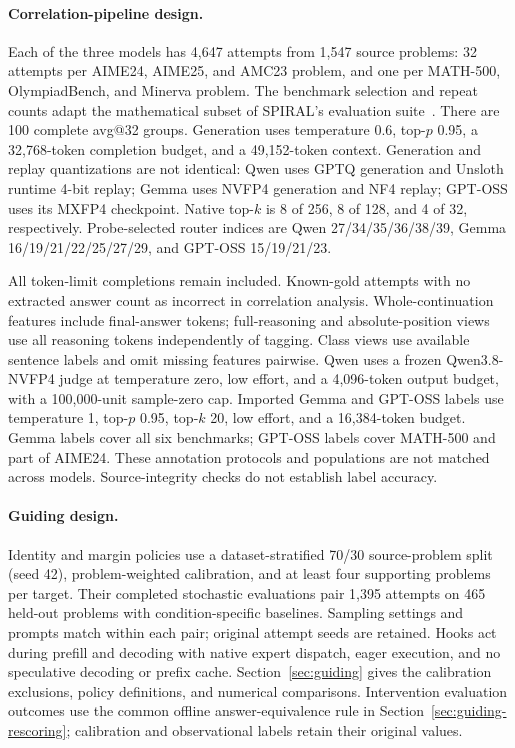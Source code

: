 \paragraph{Correlation-pipeline design.}
Each of the three models has 4,647 attempts from 1,547 source problems:
32 attempts per AIME24, AIME25, and AMC23 problem, and one per MATH-500,
OlympiadBench, and Minerva problem. The benchmark selection and
repeat counts adapt the mathematical subset of SPIRAL's evaluation
suite~\cite{liu2025spiral}. There are 100 complete avg@32 groups.
Generation uses temperature 0.6, top-$p$ 0.95, a 32,768-token completion
budget, and a 49,152-token context. Generation and replay quantizations
are not identical: Qwen uses GPTQ generation and Unsloth runtime 4-bit
replay; Gemma uses NVFP4 generation and NF4 replay; GPT-OSS uses its
MXFP4 checkpoint. Native top-$k$ is 8 of 256, 8 of 128, and 4 of 32,
respectively. Probe-selected router indices are Qwen 27/34/35/36/38/39,
Gemma 16/19/21/22/25/27/29, and GPT-OSS 15/19/21/23.

All token-limit completions remain included. Known-gold attempts with no
extracted answer count as incorrect in correlation analysis. Whole-continuation
features include final-answer tokens; full-reasoning and absolute-position
views use all reasoning tokens independently of tagging. Class views use
available sentence labels and omit missing features pairwise.
Qwen uses a frozen Qwen3.8-NVFP4 judge at temperature zero, low effort,
and a 4,096-token output budget, with a 100,000-unit sample-zero cap.
Imported Gemma and GPT-OSS labels use temperature 1, top-$p$ 0.95,
top-$k$ 20, low effort, and a 16,384-token budget. Gemma labels cover all
six benchmarks; GPT-OSS labels cover MATH-500 and part of AIME24.
These annotation protocols and populations are not matched across models.
Source-integrity checks do not establish label accuracy.

\paragraph{Guiding design.}
Identity and margin policies use a dataset-stratified 70/30 source-problem
split (seed 42), problem-weighted calibration, and at least four supporting
problems per target. Their completed stochastic evaluations pair 1,395
attempts on 465 held-out problems with condition-specific baselines.
Sampling settings and prompts match within each pair; original attempt
seeds are retained. Hooks act during prefill and decoding with native expert
dispatch, eager execution, and no speculative decoding or prefix cache.
Section~\ref{sec:guiding} gives the calibration exclusions, policy definitions,
and numerical comparisons. Intervention evaluation outcomes use the
common offline answer-equivalence rule in Section~\ref{sec:guiding-rescoring};
calibration and observational labels retain their original values.


